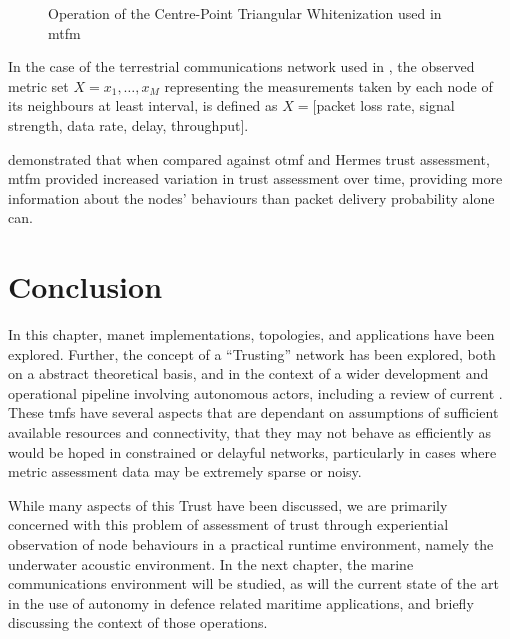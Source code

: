 \begin{figure}
	\centering
	\caption{Operation of the Centre-Point Triangular Whitenization used in \gls{mtfm}}
	\label{fig:whitenization}
\end{figure}

In the case of the terrestrial communications network used in \cite{Guo11}, the observed metric set $X = {x_1,\dots,x_M}$ representing the measurements taken by each node of its neighbours at least interval, is defined as $X=[$packet loss rate, signal strength, data rate, delay, throughput$]$.

\citet{Guo11} demonstrated that when compared against \gls{otmf} and Hermes trust assessment, \gls{mtfm} provided increased variation in trust assessment over time, providing more information about the nodes' behaviours than packet delivery probability alone can.

\section{Conclusion}
In this chapter, \gls{manet} implementations, topologies, and applications have been explored. 
Further, the concept of a ``Trusting'' network has been explored, both on a abstract theoretical basis, and in the context of a wider development and operational pipeline involving autonomous actors, including a review of current .
These \glspl{tmf} have several aspects that are dependant on assumptions of sufficient available resources and connectivity, that they may not behave as efficiently as would be hoped in constrained or delayful networks, particularly in cases where metric assessment data may be extremely sparse or noisy.

While many aspects of this Trust have been discussed, we are primarily concerned with this problem of assessment of trust through experiential observation of node behaviours in a practical runtime environment, namely the underwater acoustic environment.
In the next chapter, the marine communications environment will be studied, as will the current state of the art in the use of autonomy in defence related maritime applications, and briefly discussing the context of those operations.
